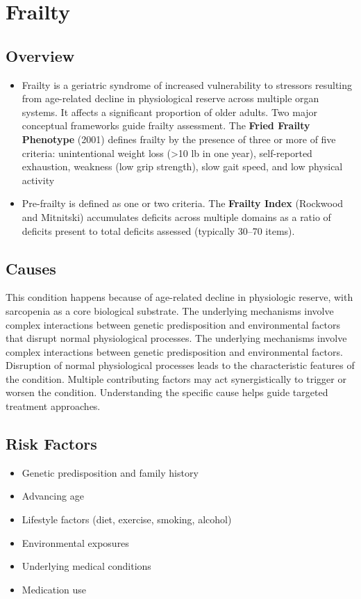 \chapter{Frailty}
\label{sec:Frailty}

\section{Overview}


\begin{itemize}[noitemsep]
  \item Frailty is a geriatric syndrome of increased vulnerability to stressors resulting from age-related decline in physiological reserve across multiple organ systems. It affects a significant proportion of older adults. Two major conceptual frameworks guide frailty assessment. The \textbf{Fried Frailty Phenotype} (2001) defines frailty by the presence of three or more of five criteria: unintentional weight loss (>10 lb in one year), self-reported exhaustion, weakness (low grip strength), slow gait speed, and low physical activity
  \item Pre-frailty is defined as one or two criteria. The \textbf{Frailty Index} (Rockwood and Mitnitski) accumulates deficits across multiple domains as a ratio of deficits present to total deficits assessed (typically 30--70 items).
\end{itemize}
\section{Causes}
This condition happens because of age-related decline in physiologic reserve, with sarcopenia as a core biological substrate. The underlying mechanisms involve complex interactions between genetic predisposition and environmental factors that disrupt normal physiological processes. The underlying mechanisms involve complex interactions between genetic predisposition and environmental factors. Disruption of normal physiological processes leads to the characteristic features of the condition. Multiple contributing factors may act synergistically to trigger or worsen the condition. Understanding the specific cause helps guide targeted treatment approaches.
\section{Risk Factors}


\begin{itemize}[noitemsep]
  \item Genetic predisposition and family history
  \item Advancing age
  \item Lifestyle factors (diet, exercise, smoking, alcohol)
  \item Environmental exposures
  \item Underlying medical conditions
  \item Medication use
\end{itemize}
